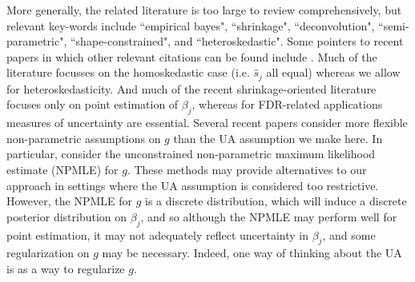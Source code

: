 \documentclass[11pt]{article}
\def\bhat{\hat{\beta}}
\def\shat{\hat{s}}
\begin{document}
More generally, the related literature is too large to review comprehensively, but relevant key-words include ``empirical bayes", ``shrinkage", ``deconvolution", ``semi-parametric", ``shape-constrained", and ``heteroskedastic". Some pointers to recent papers in which other relevant
citations can be found include \cite{xie2012sure, sarkar:2014, koenker2014convex}. Much of the literature focusses on the homoskedastic case (i.e. $\shat_j$ all equal) whereas we allow for heteroskedasticity. And much of the recent shrinkage-oriented literature focuses only on point estimation of $\beta_j$, whereas for FDR-related applications measures of uncertainty are essential. Several recent papers consider more flexible non-parametric assumptions on 
$g$ than the UA assumption we make here. In particular, \cite{jiang2009general,koenker2014convex} consider the unconstrained non-parametric maximum likelihood
estimate (NPMLE) for $g$. These methods may provide alternatives to our approach in settings where the UA assumption is considered too restrictive. However, the  NPMLE for $g$ is a discrete distribution, which will induce a discrete posterior distribution on $\beta_j$, and so although the NPMLE
may perform well for point estimation, it may not adequately reflect uncertainty in $\beta_j$, and some regularization on $g$ may be necessary.
Indeed, one way of thinking about the UA is as a way to regularize $g$.


\end{document}
